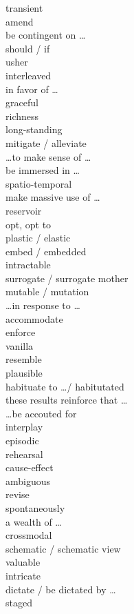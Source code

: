 \documentclass[12pt]{article}
\begin{document}
transient \\
amend \\
be contingent on \dots \\
should / if \\
usher \\
interleaved \\
in favor of \dots \\
graceful \\
richness \\
long-standing \\
mitigate / alleviate \\
\dots to make sense of \dots \\
be immersed in \dots \\
spatio-temporal \\
make massive use of \dots \\
reservoir \\
opt, opt to \\
plastic / elastic \\
embed / embedded \\
intractable \\
surrogate / surrogate mother \\
mutable / mutation \\
\dots in response to \dots \\
accommodate \\
enforce \\
vanilla \\
resemble \\
plausible \\
habituate to \dots / habitutated \\
these results reinforce that \dots \\
\dots be accouted for \\
interplay \\
episodic \\
rehearsal \\
cause-effect \\
ambiguous \\
revise \\
spontaneously \\
a wealth of \dots \\
crossmodal \\
schematic / schematic view \\
valuable \\
intricate \\
dictate / be dictated by \dots \\
staged \\
\end{document}

